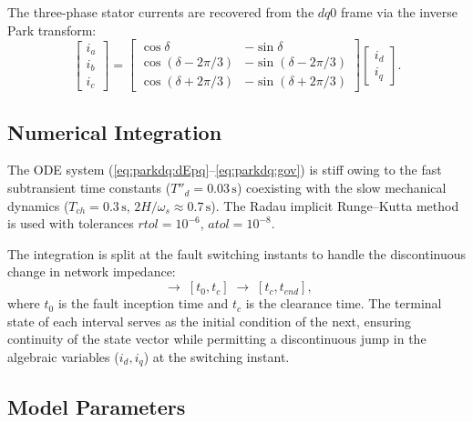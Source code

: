 \documentclass[12pt,a4paper]{article}
\theoremstyle{definition}
\theoremstyle{plain}
\newcommand{\sss}{\,\text{s}}
\begin{document}
The three-phase stator currents are recovered from the $dq0$ frame via the
inverse Park transform:
\begin{equation}
  \begin{bmatrix} i_a \\ i_b \\ i_c \end{bmatrix}
  =
  \begin{bmatrix}
    \cos\delta             & -\sin\delta             \\
    \cos(\delta - 2\pi/3)  & -\sin(\delta - 2\pi/3)  \\
    \cos(\delta + 2\pi/3)  & -\sin(\delta + 2\pi/3)
  \end{bmatrix}
  \begin{bmatrix} i_d \\ i_q \end{bmatrix}.
  \label{eq:parkdq:park_inv}
\end{equation}

\subsection{Numerical Integration}
\label{sec:parkdq:integration}

The ODE system (\cref{eq:parkdq:dEpq}--\cref{eq:parkdq:gov}) is stiff owing
to the fast subtransient time constants ($T''_d = 0.03\sss$) coexisting with
the slow mechanical dynamics ($T_{ch} = 0.3\sss$, $2H/\omega_s \approx 0.7\sss$).
The Radau implicit Runge--Kutta method \citep{HairerWanner1996} is used with
tolerances $rtol = 10^{-6}$, $atol = 10^{-8}$.

The integration is split at the fault switching instants to handle the
discontinuous change in network impedance:
\begin{equation}
  [t_0^-, t_0] \;\to\; [t_0, t_c] \;\to\; [t_c, t_{end}],
\end{equation}
where $t_0$ is the fault inception time and $t_c$ is the clearance time.
The terminal state of each interval serves as the initial condition of the
next, ensuring continuity of the state vector while permitting a discontinuous
jump in the algebraic variables ($i_d, i_q$) at the switching instant.

\subsection{Model Parameters}
\label{sec:parkdq:params}
\end{document}
